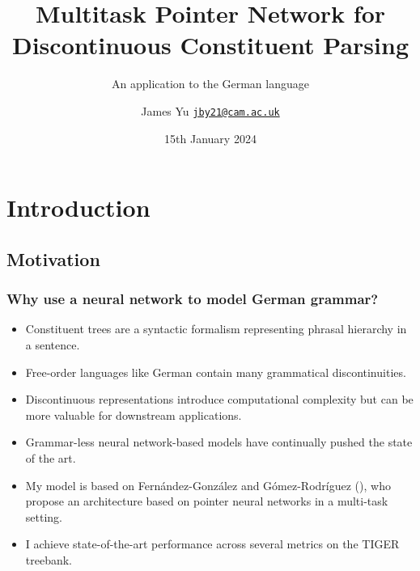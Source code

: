 \documentclass[8pt,handout]{beamer}
\date[15/01/24]{15th January 2024}
\title[Discontinuous Constituent Parsing]{Multitask Pointer Network for Discontinuous Constituent Parsing}
\subtitle[An application to German]{An application to the German language}
\author[J. Yu]{James Yu \newline \href{mailto:jby21@cam.ac.uk}{\texttt{jby21@cam.ac.uk}}}
\institute[Cambridge]{Faculty of Economics \\ University of Cambridge}
\theoremstyle{definition}
\theoremstyle{plain}
\theoremstyle{definition}
\theoremstyle{remark}
\numberwithin{equation}{section}
\numberwithin{figure}{section}
\numberwithin{table}{section}
\begin{document}
\begin{frame}
    \titlepage
\end{frame}

\section{Introduction}
\subsection{Motivation}
\begin{frame}
    \frametitle{Why use a neural network to model German grammar?}
    \begin{itemize}
        \item Constituent trees are a syntactic formalism representing phrasal hierarchy in a sentence.

        \item Free-order languages like German contain many grammatical discontinuities.

        \item Discontinuous representations introduce computational complexity but can be more valuable for downstream applications.
        
        \item Grammar-less neural network-based models have continually pushed the state of the art.

        \item My model is based on Fernández-González and Gómez-Rodríguez (\citeyear{fernandez2022multitask2}), who propose an architecture based on pointer neural networks in a multi-task setting.

        \item I achieve state-of-the-art performance across several metrics on the TIGER treebank.
    \end{itemize}
\end{frame}
\end{document}
